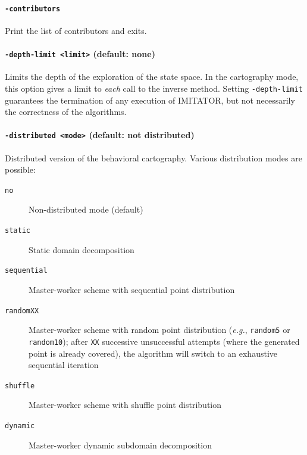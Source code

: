 \documentclass[a4paper,11pt]{report}
\makeatletter
\newcommand{\imitator}{\textsf{IMITATOR}}
\newcommand{\styleOption}[1]{\textcolor{optioncolor}{\texttt{#1}}}
\newcommand{\eg}{\textcolor{colorok}{\textit{e.g.},\@}}
\makeatother
\begin{document}
\paragraph{\styleOption{-contributors}}
Print the list of contributors and exits.


\paragraph{\styleOption{-depth-limit <limit>} (default: none)}
Limits the depth of the exploration of the state space.
In the cartography mode, this option gives a limit to \emph{each} call to the inverse method.
Setting \styleOption{-depth-limit} guarantees the termination of any execution of \imitator{}, but not necessarily the correctness of the algorithms.


\paragraph{\styleOption{-distributed <mode>} (default: not distributed)}
Distributed version of the behavioral cartography.
Various distribution modes are possible:

\begin{description}
	\item[\styleOption{no}] Non-distributed mode (default)
	\item[\styleOption{static}] Static domain decomposition \cite{ACN15}
	\item[\styleOption{sequential}] Master-worker scheme with sequential point distribution \cite{ACE14}
	\item[\styleOption{randomXX}] Master-worker scheme with random point distribution (\eg{} \styleOption{random5} or \styleOption{random10}); after \styleOption{XX} successive unsuccessful attempts (where the generated point is already covered), the algorithm will switch to an exhaustive sequential iteration \cite{ACE14}
	\item[\styleOption{shuffle}] Master-worker scheme with shuffle point distribution \cite{ACN15}
	\item[\styleOption{dynamic}] Master-worker dynamic subdomain decomposition \cite{ACN15}
\end{description}
\end{document}
